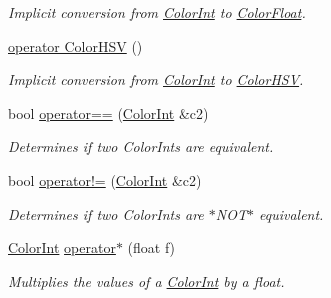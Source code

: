 \begin{DoxyCompactItemize}
\begin{DoxyCompactList}\small\item\em \-Implicit conversion from \hyperlink{structtsgl_1_1_color_int}{\-Color\-Int} to \hyperlink{structtsgl_1_1_color_float}{\-Color\-Float}. \end{DoxyCompactList}\item 
\hyperlink{structtsgl_1_1_color_int_acbd82ad2c6388389aa3474f042a25353}{operator Color\-H\-S\-V} ()
\begin{DoxyCompactList}\small\item\em \-Implicit conversion from \hyperlink{structtsgl_1_1_color_int}{\-Color\-Int} to \hyperlink{structtsgl_1_1_color_h_s_v}{\-Color\-H\-S\-V}. \end{DoxyCompactList}\item 
bool \hyperlink{structtsgl_1_1_color_int_a7d6282c79f42d4ba9a70c4475b8170c2}{operator==} (\hyperlink{structtsgl_1_1_color_int}{\-Color\-Int} \&c2)
\begin{DoxyCompactList}\small\item\em \-Determines if two \-Color\-Ints are equivalent. \end{DoxyCompactList}\item 
bool \hyperlink{structtsgl_1_1_color_int_af83865a1b76eb8c0a5e0fe4bc34fab2d}{operator!=} (\hyperlink{structtsgl_1_1_color_int}{\-Color\-Int} \&c2)
\begin{DoxyCompactList}\small\item\em \-Determines if two \-Color\-Ints are $\ast$\-N\-O\-T$\ast$ equivalent. \end{DoxyCompactList}\item 
\hyperlink{structtsgl_1_1_color_int}{\-Color\-Int} \hyperlink{structtsgl_1_1_color_int_aa6dbbe3d7d1653e16eadc1843a6c3be1}{operator$\ast$} (float f)
\begin{DoxyCompactList}\small\item\em \-Multiplies the values of a \hyperlink{structtsgl_1_1_color_int}{\-Color\-Int} by a float. \end{DoxyCompactList}\end{DoxyCompactItemize}
